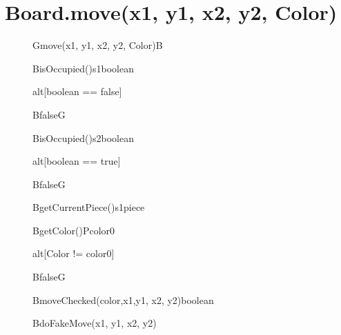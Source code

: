\documentclass[8pt]{article}
\begin{document}
\section{Board.move(x1, y1, x2, y2, Color)}
\begin{figure}[H]
	\centering
  	\begin{adjustbox}{width=\textwidth, height=\textheight}
		\begin{sequencediagram}
			
			\begin{messcall}{G}{move(x1, y1, x2, y2, Color)}{B}{}	
				\begin{call}{B}{isOccupied()}{s1}{boolean}
				\end{call}
				\begin{sdblock}{alt}{[boolean == false]}
					\begin{messcall}{B}{false}{G}
					\end{messcall} 					  		
				\end{sdblock}
				
				\begin{call}{B}{isOccupied()}{s2}{boolean}
				\end{call}
				\begin{sdblock}{alt}{[boolean == true]}
					\begin{messcall}{B}{false}{G}
					\end{messcall} 					  		
				\end{sdblock}
				
				\begin{call}{B}{getCurrentPiece()}{s1}{piece}
				\end{call}
				
				\begin{call}{B}{getColor()}{P}{color0}
				\end{call}
					
					
				\begin{sdblock}{alt}{[Color != color0]}
					\begin{messcall}{B}{false}{G}
					\end{messcall} 					  		
				\end{sdblock}
				
				\begin{callself}{B}{moveChecked(color,x1,y1, x2, y2)}{boolean}
					\begin{callself}{B}{doFakeMove(x1, y1, x2, y2)}{}
					\end{callself}
					

\end{callself}
\end{messcall}
\end{sequencediagram}
\end{adjustbox}
\end{figure}
\end{document}
